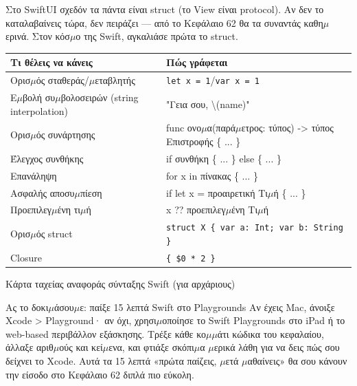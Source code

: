 Στο SwiftUI σχεδόν τα πάντα είναι struct (το View είναι protocol). Αν δεν το καταλαβαίνεις τώρα, δεν πειράζει — από το Κεφάλαιο 62 θα τα συναντάς καθη$\mu$ερινά. Στον κόσ$\mu$ο της Swift, αγκαλιάσε πρώτα το struct.


\begin{center}
\begin{tabularx}{\linewidth}{|X|X|}
\hline
\textbf{Τι θέλεις να κάνεις} & \textbf{Πώς γράφεται} \tabularnewline
\hline
Ορισ$\mu$ός σταθεράς/$\mu$εταβλητής & \texttt{let x = 1}/\texttt{var x = 1} \tabularnewline
Ε$\mu$βολή συ$\mu$βολοσειρών (string interpolation) & "Γεια σου, \textbackslash{}(name)" \tabularnewline
Ορισ$\mu$ός συνάρτησης & func ονο$\mu$α(παρά$\mu$ετρος: τύπος) -> τύπος Επιστροφής \{ ... \} \tabularnewline
Έλεγχος συνθήκης & if συνθήκη \{ ... \} else \{ ... \} \tabularnewline
Επανάληψη & for x in πίνακας \{ ... \} \tabularnewline
Ασφαλής αποσυ$\mu$πίεση & if let x = προαιρετική Τι$\mu$ή \{ ... \} \tabularnewline
Προεπιλεγ$\mu$ένη τι$\mu$ή & x ?? προεπιλεγ$\mu$ένη Τι$\mu$ή \tabularnewline
Ορισ$\mu$ός struct & \texttt{struct X \{ var a: Int; var b: String \}} \tabularnewline
Closure & \texttt{\{ \$0 * 2 \}} \tabularnewline
\hline
\end{tabularx}
\end{center}

\begin{center}\small\color{gray}Κάρτα ταχείας αναφοράς σύνταξης Swift (για αρχάριους)\end{center}

\begin{tcbpractice}{Ας το δοκι$\mu$άσου$\mu$ε: παίξε 15 λεπτά Swift στο Playgrounds}
Αν έχεις Mac, άνοιξε Xcode > Playground· αν όχι, χρησι$\mu$οποίησε το Swift Playgrounds στο iPad ή το web-based περιβάλλον εξάσκησης. Τρέξε κάθε κο$\mu$$\mu$άτι κώδικα του κεφαλαίου, άλλαξε αριθ$\mu$ούς και κεί$\mu$ενα, και φτιάξε σκόπι$\mu$α $\mu$ερικά λάθη για να δεις πώς σου δείχνει το Xcode. Αυτά τα 15 λεπτά «πρώτα παίζεις, $\mu$ετά $\mu$αθαίνεις» θα σου κάνουν την είσοδο στο Κεφάλαιο 62 διπλά πιο εύκολη.

\end{tcbpractice}

